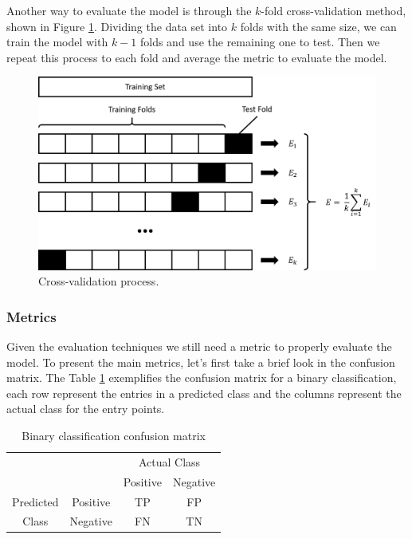 	Another way to evaluate the model is through the $k$-fold cross-validation method, shown in Figure \ref{fig:cross-validate}. Dividing the data set into $k$ folds with the same size, we can train the model with $k-1$ folds and use the remaining one to test. Then we repeat this process to each fold and average the metric to evaluate the model.

	\begin{figure}[h!]
		\centering
		\includegraphics[width=0.7\linewidth]{01.Chapters/02.Background/cross-validate}
		\caption{Cross-validation process.}
		\label{fig:cross-validate}
	\end{figure}
	
	\subsubsection{Metrics}

	Given the evaluation techniques we still need a metric to properly evaluate the model. To present the main metrics, let's first take a brief look in the confusion matrix. The Table \ref{tab:conf-matrix} exemplifies the confusion matrix for a binary classification, each row represent the entries in a predicted class and the columns represent the actual class for the entry points.
	
	\newpage
	\begin{table}[h!]
		\centering
		\caption{Binary classification confusion matrix}
		\label{tab:conf-matrix}		
		\begin{tabular}{cc|c|c|}
			\cline{3-4}
			&          & \multicolumn{2}{c|}{Actual Class} \\ \cline{3-4} 
			&          & Positive        & Negative        \\ \hline
			\multicolumn{1}{|c|}{Predicted} & Positive & TP              & FP              \\ \cline{2-4} 
			\multicolumn{1}{|c|}{Class}     & Negative & FN              & TN              \\ \hline
		\end{tabular}
	\end{table}

